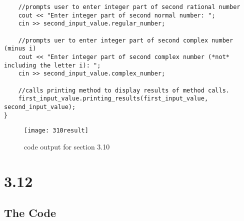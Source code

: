 \documentclass[11pt]{article}
\begin{document}
\begin{lstlisting}
    //prompts user to enter integer part of second rational number
    cout << "Enter integer part of second normal number: ";
    cin >> second_input_value.regular_number;

    //prompts uer to enter integer part of second complex number (minus i)
    cout << "Enter integer part of second complex number (*not* including the letter i): ";
    cin >> second_input_value.complex_number;

    //calls printing method to display results of method calls.
    first_input_value.printing_results(first_input_value, second_input_value);
}

\end{lstlisting}

\begin{figure}[h]
    \centering
    \texttt{[image: 310result]}
    \caption{code output for section 3.10}
    \label{fig:my_label}
\end{figure}


\section*{3.12}

\subsection*{The Code}
\end{document}
